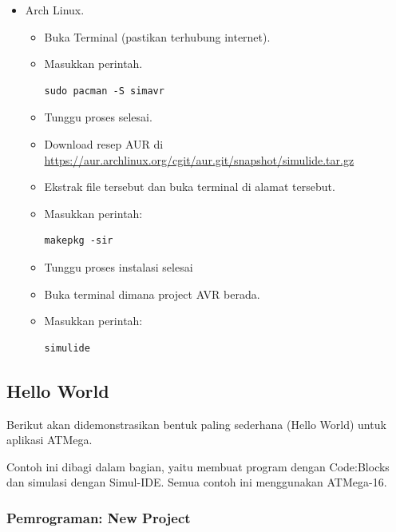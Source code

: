 \documentclass[12pt,]{article}
\begin{document}
\begin{itemize}
		\item Arch Linux.
		\begin{itemize}
			\item Buka Terminal (pastikan terhubung internet).
			\item Masukkan perintah.
			\begin{verbatim}
sudo pacman -S simavr
			\end{verbatim}
			\item Tunggu proses selesai.
			\item Download resep AUR di \url{https://aur.archlinux.org/cgit/aur.git/snapshot/simulide.tar.gz}
			\item Ekstrak file tersebut dan buka terminal di alamat tersebut.
			\item Masukkan perintah:
			\begin{verbatim}
makepkg -sir
			\end{verbatim}
			\item Tunggu proses instalasi selesai
			\item Buka terminal dimana project AVR berada.
			\item Masukkan perintah:
			\begin{verbatim}
simulide
			\end{verbatim}
		\end{itemize}

	\end{itemize}

	\newpage
	\subsection{Hello World}

	Berikut akan didemonstrasikan bentuk paling sederhana (Hello World) untuk aplikasi ATMega.

	Contoh ini dibagi dalam bagian, yaitu membuat program dengan Code:Blocks dan simulasi dengan Simul-IDE.
	Semua contoh ini menggunakan ATMega-16.

	\subsubsection{Pemrograman: New Project}
\end{document}
